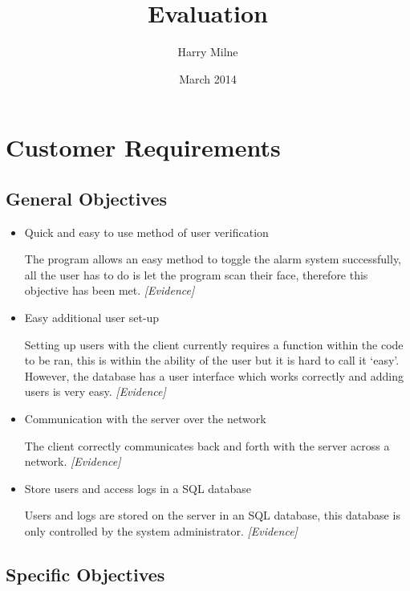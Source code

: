 \documentclass[a4paper]{article}
\title{Evaluation}
\author{Harry Milne}
\date{March 2014}
\begin{document}
\maketitle
\tableofcontents
\newpage
\section{Customer Requirements}
	
	\subsection{General Objectives}
	
		\begin{itemize}
			\item Quick and easy to use method of user verification

			The program allows an easy method to toggle the alarm system successfully, all the user has
			to do is let the program scan their face, therefore this objective has been met. \textit{[Evidence]}

			\item Easy additional user set-up

			Setting up users with the client currently requires a function within the code to be ran,
			this is within the ability of the user but it is hard to call it `easy'. However, the database
			has a user interface which works correctly and adding users is very easy. \textit{[Evidence]}

			\item Communication with the server over the network

			The client correctly communicates back and forth with the server across a network. \textit{[Evidence]}
 
			\item Store users and access logs in a SQL database

			Users and logs are stored on the server in an SQL database, this database is only controlled
			by the system administrator. \textit{[Evidence]}
		\end{itemize}

	\subsection{Specific Objectives}
\end{document}
